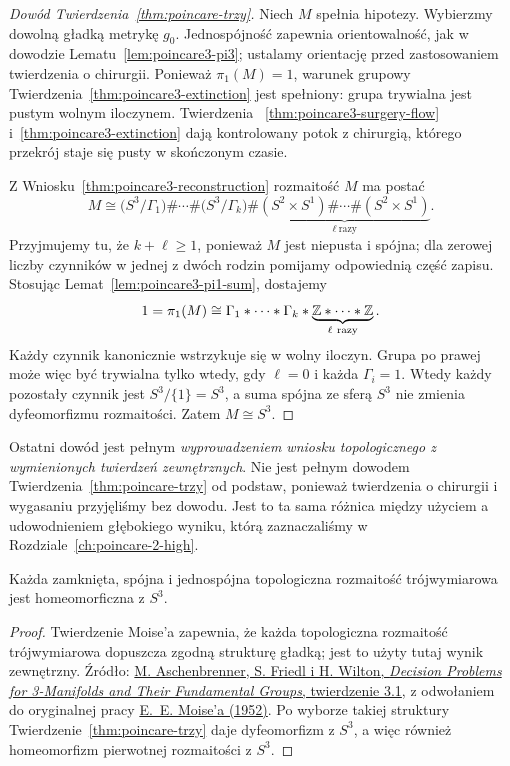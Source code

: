 \begin{proof}[Dowód Twierdzenia~\ref{thm:poincare-trzy}]
Niech $M$ spełnia hipotezy. Wybierzmy
dowolną gładką metrykę $g_0$. Jednospójność zapewnia
orientowalność, jak w dowodzie Lematu~\ref{lem:poincare3-pi3};
ustalamy orientację przed zastosowaniem twierdzenia o chirurgii.
Ponieważ $\pi_1(M)=1$, warunek grupowy
Twierdzenia~\ref{thm:poincare3-extinction}
jest spełniony: grupa trywialna jest
pustym wolnym iloczynem. Twierdzenia
~\ref{thm:poincare3-surgery-flow}
i~\ref{thm:poincare3-extinction} dają
kontrolowany potok z chirurgią, którego
przekrój staje się pusty w skończonym czasie.

Z Wniosku~\ref{thm:poincare3-reconstruction}
rozmaitość $M$ ma postać
\[
 M\cong\bigl(S^3/\Gamma_1\bigr)\#\cdots\#
 \bigl(S^3/\Gamma_k\bigr)
 \#\underbrace{(S^2\times S^1)\#\cdots\#
 (S^2\times S^1)}_{\ell\ \text{razy}}.
\]
Przyjmujemy tu, że $k+\ell\geq1$, ponieważ
$M$ jest niepusta i spójna; dla zerowej liczby
czynników w jednej z dwóch rodzin pomijamy
odpowiednią część zapisu.
Stosując Lemat~\ref{lem:poincare3-pi1-sum},
dostajemy
\[
 1=\pi_1(M)\cong
 \Gamma_1*\cdots*\Gamma_k*
 \underbrace{\mathbb{Z}*\cdots*\mathbb{Z}}_{\ell\ \text{razy}}.
\]
Każdy czynnik kanonicznie wstrzykuje się
w wolny iloczyn. Grupa po prawej może
więc być trywialna tylko wtedy, gdy
$\ell=0$ i każda $\Gamma_i=1$.
Wtedy każdy pozostały czynnik jest
$S^3/\{1\}=S^3$, a suma spójna
ze sferą $S^3$ nie zmienia dyfeomorfizmu
rozmaitości. Zatem $M\cong S^3$.
\end{proof}

Ostatni dowód jest pełnym \emph{wyprowadzeniem
wniosku topologicznego z wymienionych twierdzeń
zewnętrznych}. Nie jest pełnym dowodem
Twierdzenia~\ref{thm:poincare-trzy} od podstaw,
ponieważ twierdzenia o chirurgii i wygasaniu
przyjęliśmy bez dowodu. Jest to ta sama
różnica między użyciem a udowodnieniem
głębokiego wyniku, którą zaznaczaliśmy
w Rozdziale~\ref{ch:poincare-2-high}.

\begin{wniosek}
\label{cor:poincare-trzy-topologiczna}
Każda zamknięta, spójna i jednospójna topologiczna
rozmaitość trójwymiarowa jest homeomorficzna z $S^3$.
\end{wniosek}
\begin{proof}
Twierdzenie Moise'a zapewnia, że każda topologiczna
rozmaitość trójwymiarowa dopuszcza zgodną strukturę gładką;
jest to użyty tutaj wynik zewnętrzny.
Źródło: \href{https://msp.org/gtm/2015/19-1/gtm-v19-n1-p08-s.pdf}
{M. Aschenbrenner, S. Friedl i H. Wilton,
\emph{Decision Problems for 3-Manifolds and Their
Fundamental Groups}, twierdzenie 3.1},
z odwołaniem do oryginalnej pracy
\href{https://doi.org/10.2307/1969769}
{E.~E. Moise'a (1952)}. Po wyborze takiej struktury
Twierdzenie~\ref{thm:poincare-trzy} daje dyfeomorfizm
z $S^3$, a więc również homeomorfizm pierwotnej
rozmaitości z $S^3$.
\end{proof}

